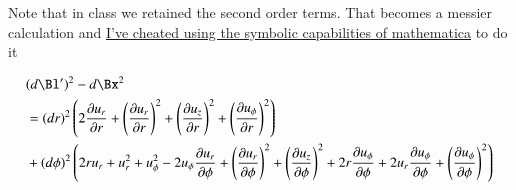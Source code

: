 Note that in class we retained the second order terms.  That becomes a messier calculation and \href{https://github.com/peeterjoot/physicsplay/blob/master/notes/phy454/strainTensorCylindrical.cdf}{I've cheated using the symbolic capabilities of mathematica} to do it

\begin{equation}\label{eqn:continuumL2:490}
\begin{aligned}
&(d\Bl')^2 - d\Bx^2 \\
&= 
(dr)^2 \left(2 \frac{\partial u_r}{\partial r}+\left(\frac{\partial u_r}{\partial r}\right)^2+\left(\frac{\partial u_z}{\partial r}\right)^2+\left(\frac{\partial u_{\phi }}{\partial r}\right)^2\right) \\
&+(d\phi )^2 \left(2 r u_r+u_r^2+u_{\phi }^2-2 u_{\phi } \frac{\partial u_r}{\partial \phi }+\left(\frac{\partial u_r}{\partial \phi }\right)^2+\left(\frac{\partial u_z}{\partial \phi }\right)^2+2 r \frac{\partial u_{\phi }}{\partial \phi }+2 u_r \frac{\partial u_{\phi }}{\partial \phi }+\left(\frac{\partial u_{\phi }}{\partial \phi }\right)^2\right) \\

\end{aligned}
\end{equation}
